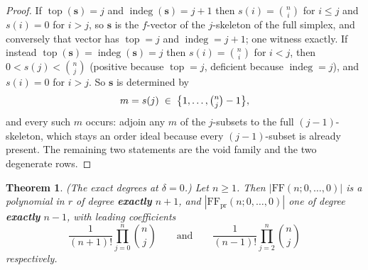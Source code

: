 \documentclass[11pt, a4paper, abstract=yes]{scrartcl}
\theoremstyle{definition}
\theoremstyle{remark}
\theoremstyle{plain}
\newtheorem{theorem}[definition]{Theorem}
\newcommand{\vek}[1]{\boldsymbol{#1}}
\newcommand{\indeg}{\operatorname{indeg}}
\newcommand{\tp}{\operatorname{top}}
\begin{document}
\begin{proof}
If \(\tp(\vek s)=j\) and \(\indeg(\vek s)=j+1\) then \(s(i)=\binom ni\) for \(i\le j\) and \(s(i)=0\)
for \(i>j\), so \(\vek s\) is the \(f\)-vector of the \(j\)-skeleton of the full simplex, and
conversely that vector has \(\tp=j\) and \(\indeg=j+1\); one witness exactly. If instead
\(\tp(\vek s)=\indeg(\vek s)=j\) then \(s(i)=\binom ni\) for \(i<j\), then
\(0<s(j)<\binom nj\) (positive because \(\tp=j\), deficient because \(\indeg=j\)), and
\(s(i)=0\) for \(i>j\). So \(\vek s\) is determined by
\begin{equation}\label{eq:A-structure-m}
  m=s(j)\;\in\;\bigl\lbrace1,\dots,\tbinom nj-1\bigr\rbrace ,
\end{equation}
and every such \(m\) occurs: adjoin any \(m\) of the \(j\)-subsets to the full \((j-1)\)-skeleton,
which stays an order ideal because every \((j-1)\)-subset is already present. The remaining two
statements are the void family and the two degenerate rows.
\end{proof}

\begin{theorem}
(\emph{The exact degrees at \(\delta=0\).}) Let \(n\ge1\). Then \(|\mathrm{FF}(n;0,\dots,0)|\) is a
polynomial in \(r\) of degree \textbf{exactly} \(n+1\), and \(|\mathrm{FF}_{\mathrm{pr}}(n;0,\dots,0)|\) one
of degree \textbf{exactly} \(n-1\), with leading coefficients
\begin{equation}\label{eq:delta0-leading}
  \frac{1}{(n+1)!}\prod_{j=0}^{n}\binom nj
  \qquad\text{and}\qquad
  \frac{1}{(n-1)!}\prod_{j=2}^{n}\binom nj
\end{equation}
respectively.
\label{thm-delta0-degrees}
\end{theorem}
\end{document}
